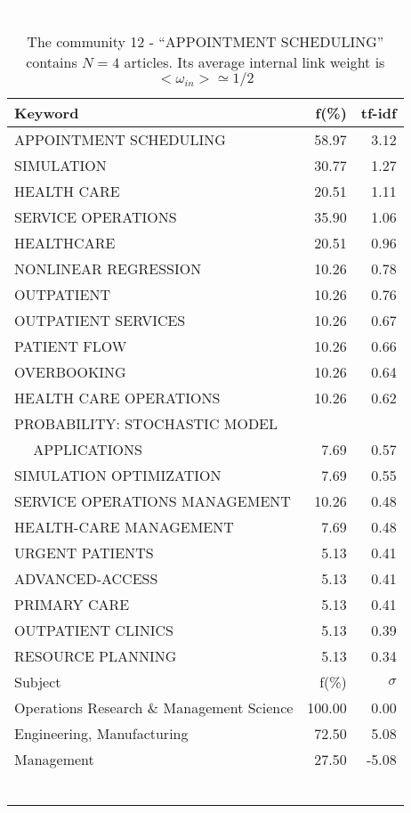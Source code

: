 \documentclass[a4paper,11pt]{report}
\begin{document}
\begin{landscape}
\begin{table}[!ht]
\caption{The community 12 - ``APPOINTMENT SCHEDULING'' contains $N = 4$ articles. Its average internal link weight is $<\omega_{in}> \simeq 1/2$ }
\textcolor{white}{aa}\\
{\scriptsize\begin{tabular}{|l r  r|}
\hline
Keyword & f(\%) & tf-idf \\
\hline
APPOINTMENT SCHEDULING & 58.97 & 3.12\\
SIMULATION & 30.77 & 1.27\\
HEALTH CARE & 20.51 & 1.11\\
SERVICE OPERATIONS & 35.90 & 1.06\\
HEALTHCARE & 20.51 & 0.96\\
NONLINEAR REGRESSION & 10.26 & 0.78\\
OUTPATIENT & 10.26 & 0.76\\
OUTPATIENT SERVICES & 10.26 & 0.67\\
PATIENT FLOW & 10.26 & 0.66\\
OVERBOOKING & 10.26 & 0.64\\
HEALTH CARE OPERATIONS & 10.26 & 0.62\\
PROBABILITY: STOCHASTIC MODEL &  &\\
$\quad$ APPLICATIONS & 7.69 & 0.57\\
SIMULATION OPTIMIZATION & 7.69 & 0.55\\
SERVICE OPERATIONS MANAGEMENT & 10.26 & 0.48\\
HEALTH-CARE MANAGEMENT & 7.69 & 0.48\\
URGENT PATIENTS & 5.13 & 0.41\\
ADVANCED-ACCESS & 5.13 & 0.41\\
PRIMARY CARE & 5.13 & 0.41\\
OUTPATIENT CLINICS & 5.13 & 0.39\\
RESOURCE PLANNING & 5.13 & 0.34\\
\hline
\hline
Subject & f(\%) & $\sigma$\\
\hline
Operations Research \& Management Science & 100.00 & 0.00\\
Engineering, Manufacturing & 72.50 & 5.08\\
Management & 27.50 & -5.08\\
 &  & \\
 &  & \\
 &  & \\
 &  & \\
 &  & \\
 &  & \\

\end{tabular}}
\end{table}
\end{landscape}
\end{document}

